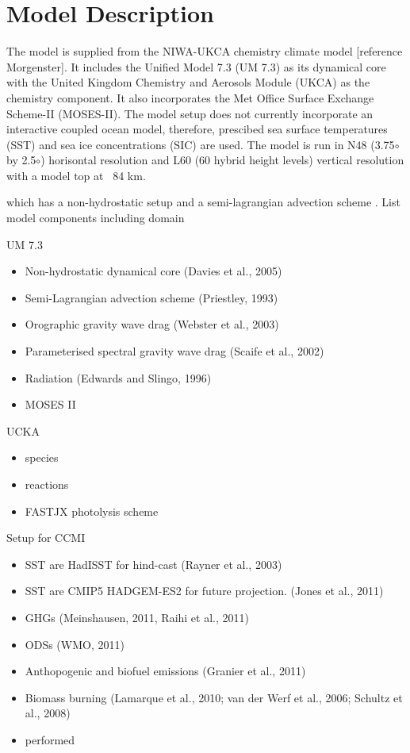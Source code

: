 \section{Model Description}

The model is supplied from the NIWA-UKCA chemistry climate model [reference Morgenster]. It includes the Unified Model 7.3 (UM 7.3) as its dynamical core with the United Kingdom Chemistry and Aerosols Module (UKCA) as the chemistry component. It also incorporates the Met Office Surface Exchange Scheme-II (MOSES-II). The model setup does not currently incorporate an interactive coupled ocean model, therefore, prescibed sea surface temperatures (SST) and sea ice concentrations (SIC) are used. The model is run in N48 (3.75$\circ$ by 2.5$\circ$) horisontal resolution and L60 (60 hybrid height levels) vertical resolution with a model top at ~84 km.

which has a non-hydrostatic setup \citep{Davies:2005vu} and a semi-lagrangian advection scheme \citep{Priestley:1993ur}.
List model components including domain

UM 7.3
\begin{itemize}
\item Non-hydrostatic dynamical core (Davies et al., 2005)
\item Semi-Lagrangian advection scheme (Priestley, 1993)
\item Orographic gravity wave drag (Webster et al., 2003)
\item Parameterised spectral gravity wave drag (Scaife et al., 2002)
\item Radiation (Edwards and Slingo, 1996)
\item MOSES II
\end{itemize}
UCKA
\begin{itemize}
\item species
\item reactions
\item FASTJX photolysis scheme
\end{itemize}
Setup for CCMI
\begin{itemize}
\item SST are HadISST for hind-cast (Rayner et al., 2003)
\item SST are CMIP5 HADGEM-ES2 for future projection. (Jones et al., 2011)
\item GHGs (Meinshausen, 2011, Raihi et al., 2011)
\item ODSs (WMO, 2011)
\item Anthopogenic and biofuel emissions (Granier et al., 2011)
\item Biomass burning (Lamarque et al., 2010; van der Werf et al., 2006; Schultz et al., 2008)
\item performed
\end{itemize}


